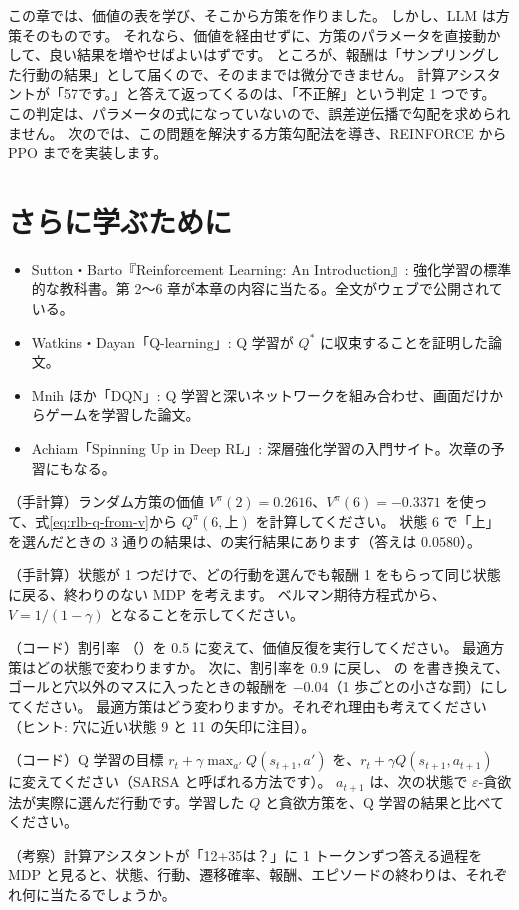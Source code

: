 この章では、価値の表を学び、そこから方策を作りました。
しかし、LLM は方策そのものです。
それなら、価値を経由せずに、方策のパラメータを直接動かして、良い結果を増やせばよいはずです。
ところが、報酬は「サンプリングした行動の結果」として届くので、そのままでは微分できません。
計算アシスタントが「57です。」と答えて返ってくるのは、「不正解」という判定 1 つです。
この判定は、パラメータの式になっていないので、誤差逆伝播で勾配を求められません。
次のでは、この問題を解決する方策勾配法を導き、REINFORCE から PPO までを実装します。

\section*{さらに学ぶために}

\begin{itemize}
\item Sutton・Barto『Reinforcement Learning: An Introduction』\cite{sutton2018rl}: 強化学習の標準的な教科書。第 2〜6 章が本章の内容に当たる。全文がウェブで公開されている。
\item Watkins・Dayan「Q-learning」\cite{watkins1992q}: Q 学習が $Q^\ast$ に収束することを証明した論文。
\item Mnih ほか「DQN」\cite{mnih2015human}: Q 学習と深いネットワークを組み合わせ、画面だけからゲームを学習した論文。
\item Achiam「Spinning Up in Deep RL」\cite{achiam2018spinningup}: 深層強化学習の入門サイト。次章の予習にもなる。
\end{itemize}

\begin{exercises}
\item （手計算）ランダム方策の価値 $V^\pi(2)=0.2616$、$V^\pi(6)=-0.3371$ を使って、式\eqref{eq:rlb-q-from-v}から $Q^\pi(6,\text{上})$ を計算してください。
状態 6 で「上」を選んだときの 3 通りの結果は、の実行結果にあります（答えは $0.0580$）。
\item （手計算）状態が 1 つだけで、どの行動を選んでも報酬 1 をもらって同じ状態に戻る、終わりのない MDP を考えます。
ベルマン期待方程式から、$V=1/(1-\gamma)$ となることを示してください。
\item （コード）割引率 （）を 0.5 に変えて、価値反復を実行してください。
最適方策はどの状態で変わりますか。
次に、割引率を 0.9 に戻し、 の  を書き換えて、ゴールと穴以外のマスに入ったときの報酬を $-0.04$（1 歩ごとの小さな罰）にしてください。
最適方策はどう変わりますか。それぞれ理由も考えてください（ヒント: 穴に近い状態 9 と 11 の矢印に注目）。
\item （コード）Q 学習の目標 $r_t+\gamma\max_{a'}Q(s_{t+1},a')$ を、$r_t+\gamma Q(s_{t+1},a_{t+1})$ に変えてください（SARSA と呼ばれる方法です）。
$a_{t+1}$ は、次の状態で $\varepsilon$-貪欲法が実際に選んだ行動です。学習した $Q$ と貪欲方策を、Q 学習の結果と比べてください。
\item （考察）計算アシスタントが「12+35は？」に 1 トークンずつ答える過程を MDP と見ると、状態、行動、遷移確率、報酬、エピソードの終わりは、それぞれ何に当たるでしょうか。
\end{exercises}
